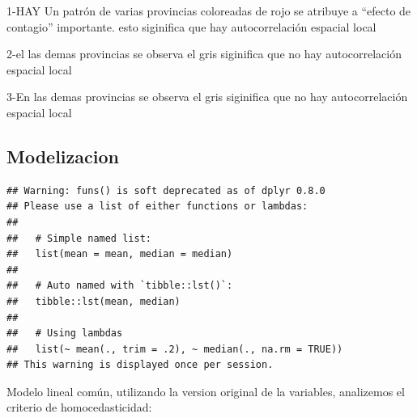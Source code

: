 \documentclass[11pt,]{article}
\newenvironment{Shaded}{\begin{snugshade}}{\end{snugshade}}
\newcommand{\KeywordTok}[1]{\textcolor[rgb]{0.13,0.29,0.53}{\textbf{#1}}}
\newcommand{\DataTypeTok}[1]{\textcolor[rgb]{0.13,0.29,0.53}{#1}}
\newcommand{\DecValTok}[1]{\textcolor[rgb]{0.00,0.00,0.81}{#1}}
\newcommand{\StringTok}[1]{\textcolor[rgb]{0.31,0.60,0.02}{#1}}
\newcommand{\OperatorTok}[1]{\textcolor[rgb]{0.81,0.36,0.00}{\textbf{#1}}}
\newcommand{\NormalTok}[1]{#1}
\begin{document}
1-HAY Un patrón de varias provincias coloreadas de rojo se atribuye a
``efecto de contagio'' importante. esto siginifica que hay
autocorrelación espacial local

2-el las demas provincias se observa el gris siginifica que no hay
autocorrelación espacial local

3-En las demas provincias se observa el gris siginifica que no hay
autocorrelación espacial local

\subsection{Modelizacion}\label{modelizacion}

\begin{Shaded}
\end{Shaded}

\begin{verbatim}
## Warning: funs() is soft deprecated as of dplyr 0.8.0
## Please use a list of either functions or lambdas: 
## 
##   # Simple named list: 
##   list(mean = mean, median = median)
## 
##   # Auto named with `tibble::lst()`: 
##   tibble::lst(mean, median)
## 
##   # Using lambdas
##   list(~ mean(., trim = .2), ~ median(., na.rm = TRUE))
## This warning is displayed once per session.
\end{verbatim}

Modelo lineal común, utilizando la version original de la variables,
analizemos el criterio de homocedasticidad:

\begin{Shaded}
\end{Shaded}
\end{document}
